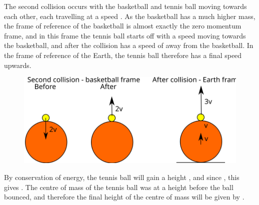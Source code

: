 \begin{problem}[Superball]
{The second collision occurs with the basketball and tennis ball moving towards each other, each travelling at a speed . As the basketball has a much higher mass, the frame of reference of the basketball is almost exactly the zero momentum frame, and in this frame the tennis ball starts off with a speed  moving towards the basketball, and after the collision has a speed of  away from the basketball. In the frame of reference of the Earth, the tennis ball therefore has a final speed  upwards.

\begin{figure}[h]
\centering
\includegraphics[width=1.0\textwidth]{../../../figures/dynamics_tennis_basket_ball_second.svg}
\caption{}\label{fig:dynamics_tennis_basket_second}
\end{figure}


By conservation of energy, the tennis ball will gain a height , and since , this gives . The centre of mass of the tennis ball was at a height  before the ball bounced, and therefore the final height of the centre of mass will be given by .
}
\end{problem}